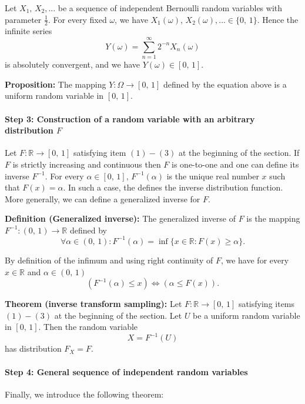 \documentclass[a4paper]{extarticle}
\begin{document}
Let \(X_1, \, X_2,...\) be a sequence of independent Bernoulli random variables with parameter \(\frac{1}{2}\). For every fixed \(\omega\), we have \(X_1(\omega), \, X_2(\omega),... \in \{0, \, 1\}\). Hence the infinite series
\[
    Y(\omega) = \sum_{n = 1}^{\infty}2^{-n}X_n(\omega)
\]
is absolutely convergent, and we have \(Y(\omega) \in [0, \, 1]\).

\begin{tbox}
    \textbf{Proposition:} The mapping \(Y : \Omega \to [0, \, 1]\) defined by the equation above is a uniform random variable in \([0, \, 1]\).
\end{tbox}

\paragraph{Step 3: Construction of a random variable with an arbitrary distribution \(F\)}

Let \(F : \mathbb{R} \to [0, \, 1]\) satisfying item \((1) - (3)\) at the beginning of the section. If \(F\) is strictly increasing and continuous then \(F\) is one-to-one and one can define its inverse \(F^{-1}\). For every \(\alpha \in [0, \, 1], \, F^{-1}(\alpha)\) is the unique real number \(x\) such that \(F(x) = \alpha\). In such a case, the defines the inverse distribution function. More generally, we can define a generalized inverse for \(F\).

\textbf{Definition (Generalized inverse):} The generalized inverse of \(F\) is the mapping \(F^{-1} : (0, \, 1) \to \mathbb{R}\) defined by
\[
    \forall \alpha \in (0, \, 1) : F^{-1}(\alpha) = \inf\{x \in \mathbb{R} : F(x) \geq \alpha\}.
\]

By definition of the infimum and using right continuity of \(F\), we have for every \(x \in \mathbb{R}\) and \(\alpha \in (0, \, 1)\)
\[
    (F^{-1}(\alpha) \leq x) \iff (\alpha \leq F(x)).
\]

\begin{tbox}
    \textbf{Theorem (inverse transform sampling):} Let \(F : \mathbb{R} \to [0, \, 1]\) satisfying items \((1)-(3)\) at the beginning of the section. Let \(U\) be a uniform random variable in \([0, \, 1]\). Then the random variable
    \[
        X = F^{-1}(U)
    \]
    has distribution \(F_X = F\).
\end{tbox}

\paragraph{Step 4: General sequence of independent random variables}
Finally, we introduce the following theorem:
\end{document}
